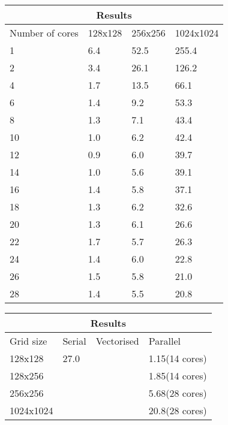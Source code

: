 \documentclass{article}
\begin{document}
\begin{multicols}{2}
\begin{center}
  \begin{tabular}{ |p{1.5cm}||p{1.5cm}|p{1.5cm}|p{1.5cm}| }
 \hline
 \multicolumn{4}{|c|}{Results} \\
 \hline
 Number of cores & 128x128 & 256x256 & 1024x1024 \\
 \hline
 1  & 6.4 &  52.5  &  255.4   \\
 2  & 3.4 &  26.1  &  126.2   \\
 4  & 1.7 &  13.5  &  66.1    \\ 
 6  & 1.4 &  9.2   &  53.3    \\ 
 8  & 1.3 &  7.1   &  43.4    \\ 
 10 & 1.0 &  6.2   &  42.4    \\
 12 & 0.9 &  6.0   &  39.7    \\
 14 & 1.0 &  5.6   &  39.1    \\ 
 16 & 1.4 &  5.8   &  37.1    \\ 
 18 & 1.3 &  6.2   &  32.6    \\
 20 & 1.3 &  6.1   &  26.6    \\
 22 & 1.7 &  5.7   &  26.3    \\ 
 24 & 1.4 &  6.0   &  22.8    \\ 
 26 & 1.5 &  5.8   &  21.0    \\ 
 28 & 1.4 &  5.5   &  20.8    \\
 \hline
\end{tabular}
\label{tab:parallelresults}
\end{center}

\begin{center}
  \begin{tabular}{ |p{1.5cm}||p{1.5cm}|p{1.5cm}|p{1.5cm}| }
 \hline
 \multicolumn{4}{|c|}{Results} \\
 \hline
 Grid size & Serial & Vectorised & Parallel \\
 \hline
 128x128    & 27.0  &    &  1.15(14 cores)   \\
 128x256    &       &    &  1.85(14 cores)   \\
 256x256    &       &    &  5.68(28 cores)   \\
 1024x1024  &       &    &  20.8(28 cores)    \\ 
 \hline
\end{tabular}
\label{tab:parallelresults}
\end{center}


\end{multicols}
\end{document}
